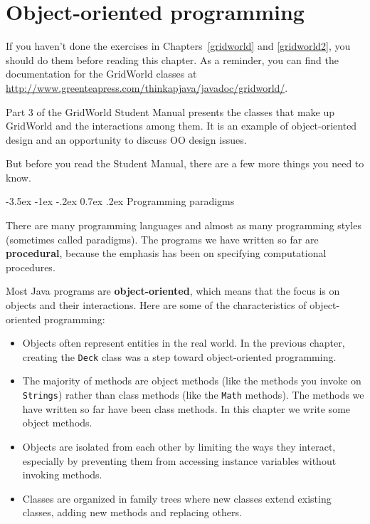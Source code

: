 \documentclass[12pt]{book}
\title{\thetitle}
\author{\theauthors}
\date{\theversion}
\makeatletter
\renewcommand{\section}{\@startsection {section}{1}{\z@}%
    {-3.5ex \@plus -1ex \@minus -.2ex}%
    {0.7ex \@plus.2ex}%
    {\normalfont\Large\bfseries}}
\theoremstyle{exercise}
\newcommand{\java}[1]{\lstinline{#1}} %
\makeatother
\begin{document}
\setcounter{chapter}{13}


\chapter{Object-oriented programming}

If you haven't done the exercises in Chapters~\ref{gridworld} and \ref{gridworld2}, you should do them before reading this chapter.
As a reminder, you can find the documentation for the GridWorld classes at \url{http://www.greenteapress.com/thinkapjava/javadoc/gridworld/}.

Part 3 of the GridWorld Student Manual presents the classes that make up GridWorld and the interactions among them.
It is an example of object-oriented design and an opportunity to discuss OO design issues.

But before you read the Student Manual, there are a few more things you need to know.


\section{Programming paradigms}


There are many programming languages and almost as many programming styles (sometimes called paradigms).
The programs we have written so far are {\bf procedural}, because the emphasis has been on specifying computational procedures.

Most Java programs are {\bf object-oriented}, which means that the focus is on objects and their interactions.
Here are some of the characteristics of object-oriented programming:

\begin{itemize}

\item Objects often represent entities in the real world.
In the previous chapter, creating the \java{Deck} class was a step toward object-oriented programming.

\item The majority of methods are object methods (like the methods you invoke on \java{Strings}) rather than class methods (like the \java{Math} methods).
The methods we have written so far have been class methods.
In this chapter we write some object methods.

\item Objects are isolated from each other by limiting the ways they interact, especially by preventing them from accessing  instance variables without invoking methods.

\item Classes are organized in family trees where new classes extend existing classes, adding new methods and replacing others.

\end{itemize}
\end{document}
